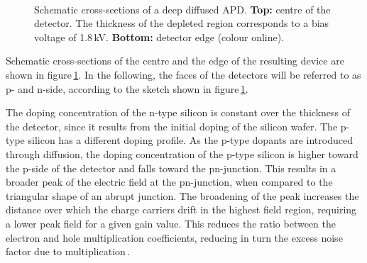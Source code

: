 \documentclass[review,number,sort&compress]{elsarticle}
\begin{document}
\begin{figure}
  \centering
  \\
  \caption{Schematic cross-sections of a deep diffused APD. {\bf Top:} centre of the detector. The thickness of the depleted region corresponds to a bias voltage of 1.8\,kV. {\bf Bottom:} detector edge (colour online).}
  \label{fig:apdDia}
\end{figure}

Schematic cross-sections of the centre and the edge of the resulting device are shown in figure\,\ref{fig:apdDia}.
In the following, the faces of the detectors will be referred to as p- and n-side, according to the sketch shown in figure\,\ref{fig:apdDia}.

The doping concentration of the n-type silicon is constant over the thickness of the detector, since it results from the initial doping of the silicon wafer.
The p-type silicon has a different doping profile.
As the p-type dopants are introduced through diffusion, the doping concentration of the p-type silicon is higher toward the p-side of the detector and falls toward the pn-junction.
This results in a broader peak of the electric field at the pn-junction, when compared to the triangular shape of an abrupt junction.
The broadening of the peak increases the distance over which the charge carriers drift in the highest field region, requiring a lower peak field for a given gain value.
This reduces the ratio between the electron and hole multiplication coefficients, reducing in turn the excess noise factor due to multiplication\,\cite{theoryDDAPD}.
\end{document}

